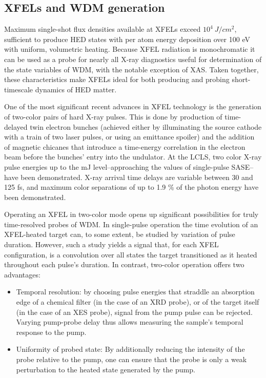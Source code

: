\documentclass [11pt, proquest, article] {uwthesis}[2016/11/22]
\begin{document}


\subsection{XFELs and WDM generation}
Maximum single-shot flux densities available at XFELs exceed $10^4~J/cm^2$, sufficient to produce HED states with per atom energy deposition over 100 eV with uniform, volumetric heating.  Because XFEL radiation is monochromatic it can be used as a probe for nearly all X-ray diagnostics useful for determination of the state variables of WDM, with the notable exception of XAS.  Taken together, these characteristics make XFELs ideal for both producing and probing short-timescale dynamics of HED matter.%

One of the most significant recent advances in XFEL technology is the generation of two-color pairs of hard X-ray pulses. This is done by production of time-delayed twin electron bunches (achieved either by illuminating the source cathode with a train of two laser pulses, or using an emittance spoiler) and the addition of magnetic chicanes that introduce a time-energy correlation in the electron beam before the bunches' entry into the undulator.\cite{marinelli2013multicolor} At the LCLS, two color X-ray pulse energies up to the mJ level--approaching the values of single-pulse SASE--have been demonstrated. X-ray arrival time delays are variable between 30 and 125 fs, and maximum color separations of up to 1.9 \% of the photon energy have been demonstrated.\cite{lutman2014demonstration}

Operating an XFEL in two-color mode opens up significant possibilities for truly time-resolved probes of WDM. In single-pulse operation the time evolution of an XFEL-heated target can, to some extent, be studied by variation of pulse duration. However, such a study yields a signal that, for each XFEL configuration, is a convolution over all states the target transitioned as it heated throughout each pulse's duration. In contrast, two-color operation offers two advantages:

\begin{itemize}
\item{Temporal resolution: by choosing pulse energies that straddle an absorption edge of a chemical filter (in the case of an XRD probe), or of the target itself (in the case of an XES probe), signal from the pump pulse can be rejected. Varying pump-probe delay thus allows measuring the sample's temporal response to the pump.}
\item{Uniformity of probed state: By additionally reducing the intensity of the probe relative to the pump, one can ensure that the probe is only a weak perturbation to the heated state generated by the pump.}
\end{itemize}
\end{document}
